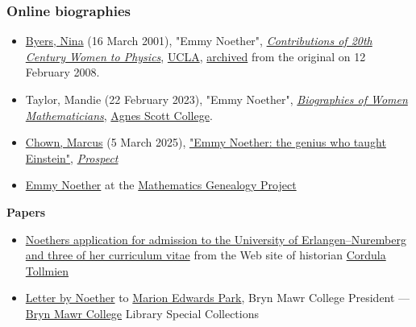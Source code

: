 \subsubsection{Online biographies}\label{Online_biographies}

\begin{itemize}
\tightlist
\item
  {\href{https://en.wikipedia.org/wiki/Nina_Byers}{Byers, Nina} (16 March 2001), "Emmy Noether", \href{http://cwp.library.ucla.edu/Phase2/Noether,_Amalie_Emmy@861234567.html}{\emph{Contributions of 20th Century Women to Physics}}, \href{https://en.wikipedia.org/wiki/UCLA}{UCLA}, \href{https://web.archive.org/web/20080212093356/http://cwp.library.ucla.edu/Phase2/Noether,_Amalie_Emmy@861234567.html}{archived} from the original on 12 February 2008{}.}
\item
  {Taylor, Mandie (22 February 2023), "Emmy Noether", \href{http://www.agnesscott.edu/lriddle/women/noether.htm}{\emph{Biographies of Women Mathematicians}}, \href{https://en.wikipedia.org/wiki/Agnes_Scott_College}{Agnes Scott College}{}.}
\item
  {\href{https://en.wikipedia.org/wiki/Marcus_Chown}{Chown, Marcus} (5 March 2025), \href{https://www.prospectmagazine.co.uk/culture/69396/emmy-noether-albert-einstein-symmetries}{"Emmy Noether: the genius who taught Einstein"}, \emph{\href{https://en.wikipedia.org/wiki/Prospect_(magazine)}{Prospect}}{}}
\end{itemize}


\begin{itemize}
\tightlist
\item
  {\href{https://mathgenealogy.org/id.php?id=6967}{Emmy Noether}{ at the }\href{https://en.wikipedia.org/wiki/Mathematics_Genealogy_Project}{Mathematics Genealogy Project}}
\end{itemize}

\textbf{Papers}

\begin{itemize}
\tightlist
\item
  {\href{https://web.archive.org/web/20070929100418/http://www.physikerinnen.de/noetherlebenslauf.html}{Noether\textquotesingle s application for admission to the University of Erlangen--Nuremberg and three of her curriculum vitae} from the Web site of historian \href{https://en.wikipedia.org/wiki/Cordula_Tollmien?action=edit&redlink=1}{Cordula Tollmien}}
\item
  {\href{https://triarte.brynmawr.edu/objects-1/info/188672}{Letter by Noether} to \href{https://en.wikipedia.org/wiki/Marion_Edwards_Park}{Marion Edwards Park}, Bryn Mawr College President --- \href{https://en.wikipedia.org/wiki/Bryn_Mawr_College}{Bryn Mawr College} Library Special Collections}
\end{itemize}

